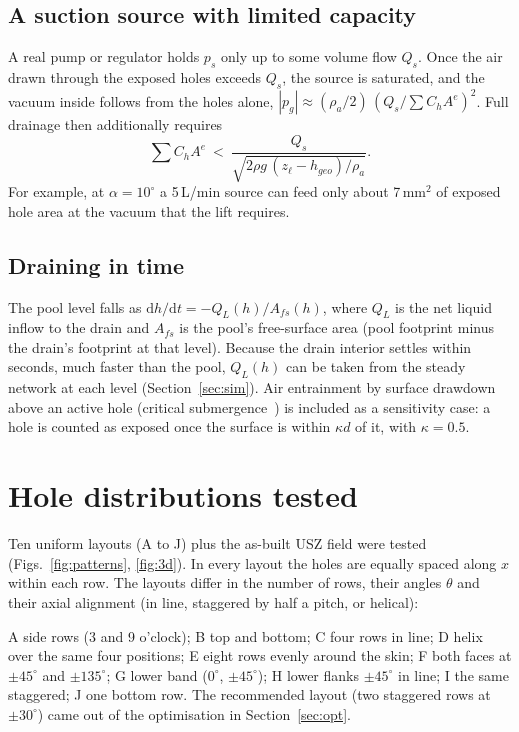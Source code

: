 \documentclass[10pt,a4paper]{article}
\newcommand{\dd}{\mathrm{d}}
\newcommand{\zl}{z_\ell}
\begin{document}
\subsection{A suction source with limited capacity}
A real pump or regulator holds $p_s$ only up to some volume flow $Q_s$. Once the air drawn through the exposed holes exceeds $Q_s$, the source is saturated, and the vacuum inside follows from the holes alone, $|p_g|\approx(\rho_a/2)\,(Q_s/\sum C_hA^e)^2$. Full drainage then additionally requires
\begin{equation}
\sum C_hA^e \ <\ \frac{Q_s}{\sqrt{2\rho g\,(\zl-h_{geo})/\rho_a}}.
\label{eq:cap-area}
\end{equation}
For example, at $\alpha=10^\circ$ a 5\,L/min source can feed only about 7\,mm$^2$ of exposed hole area at the vacuum that the lift requires.

\subsection{Draining in time}
The pool level falls as $\dd h/\dd t=-Q_L(h)/A_{fs}(h)$, where $Q_L$ is the net liquid inflow to the drain and $A_{fs}$ is the pool's free-surface area (pool footprint minus the drain's footprint at that level). Because the drain interior settles within seconds, much faster than the pool, $Q_L(h)$ can be taken from the steady network at each level (Section~\ref{sec:sim}). Air entrainment by surface drawdown above an active hole (critical submergence~\cite{gordon1970}) is included as a sensitivity case: a hole is counted as exposed once the surface is within $\kappa d$ of it, with $\kappa=0.5$.

\section{Hole distributions tested}\label{sec:layouts}
Ten uniform layouts (A to J) plus the as-built USZ field were tested (Figs.~\ref{fig:patterns}, \ref{fig:3d}). In every layout the holes are equally spaced along $x$ within each row. The layouts differ in the number of rows, their angles $\theta$ and their axial alignment (in line, staggered by half a pitch, or helical):

\noindent
A side rows (3 and 9 o'clock); B top and bottom; C four rows in line; D helix over the same four positions; E eight rows evenly around the skin; F both faces at $\pm45^\circ$ and $\pm135^\circ$; G lower band ($0^\circ$, $\pm45^\circ$); H lower flanks $\pm45^\circ$ in line; I the same staggered; J one bottom row. The recommended layout (two staggered rows at $\pm30^\circ$) came out of the optimisation in Section~\ref{sec:opt}.
\end{document}
